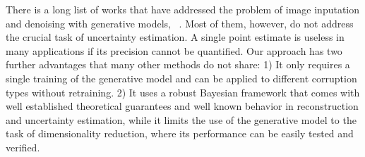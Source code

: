 \documentclass{article}
\begin{document}
There is a long list of works that have addressed the problem of image inputation and denoising with generative models, ~\citep[]{RezendeMW14, MIWAE, Mattei2018, DongLHT15, JinMcCann2016, RIMPutzky, DeepImagePrior, AmbientGAN}. Most of them, however, do not address the crucial task of uncertainty estimation. A single point estimate is useless in many applications if its precision cannot be quantified. Our approach has two further advantages that many other methods do not share: 1) It only requires a single training of the generative model and can be applied to different corruption types without retraining. 2) It uses a robust Bayesian framework that comes with well established theoretical guarantees and well known behavior in reconstruction and uncertainty estimation, while it limits the use of the generative model to the task of dimensionality reduction, where its performance can be easily tested and verified.  
\end{document}
